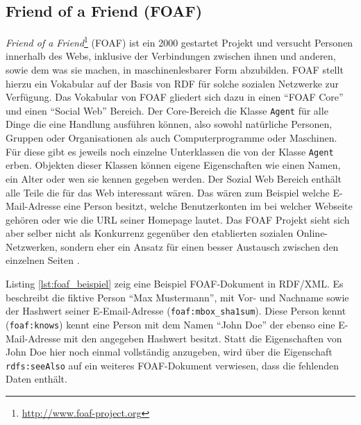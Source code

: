 

\subsection{Friend of a Friend (FOAF)} %
\label{sub:friend_of_a_friend_}

\emph{Friend of a Friend}\footnote{\url{http://www.foaf-project.org}} (FOAF) ist ein 2000 gestartet Projekt und versucht Personen innerhalb des Webs, inklusive der Verbindungen zwischen ihnen und anderen, sowie dem was sie machen, in maschinenlesbarer Form abzubilden. FOAF stellt hierzu ein Vokabular \cite{Brickley2010} auf der Basis von RDF für solche sozialen Netzwerke zur Verfügung. Das Vokabular von FOAF gliedert sich dazu in einen \enquote{FOAF Core} und einen \enquote{Social Web} Bereich. Der Core-Bereich die Klasse \texttt{Agent} für alle Dinge die eine Handlung ausführen können, also sowohl natürliche Personen, Gruppen oder Organisationen als auch Computerprogramme oder Maschinen. Für diese gibt es jeweils noch einzelne Unterklassen die von der Klasse \texttt{Agent} erben. Objekten dieser Klassen können eigene Eigenschaften wie einen Namen, ein Alter oder wen sie kennen gegeben werden. Der Sozial Web Bereich enthält alle Teile die für das Web interessant wären. Das wären zum Beispiel welche E-Mail-Adresse eine Person besitzt, welche Benutzerkonten im bei welcher Webseite gehören oder wie die URL seiner Homepage lautet. Das FOAF Projekt sieht sich aber selber nicht als Konkurrenz gegenüber den etablierten sozialen Online-Netzwerken, sondern eher ein Ansatz für einen besser Austausch zwischen den einzelnen Seiten \cite[Abstract]{Brickley2010}.

\medskip

Listing \ref{lst:foaf_beispiel} zeig eine Beispiel FOAF-Dokument in RDF/XML. Es beschreibt die fiktive Person \enquote{Max Mustermann}, mit Vor- und Nachname sowie der Hashwert seiner E-Email-Adresse (\texttt{foaf:mbox\_sha1sum}). Diese Person kennt (\texttt{foaf:knows}) kennt eine Person mit dem Namen \enquote{John Doe} der ebenso eine E-Mail-Adresse mit den angegeben Hashwert besitzt. Statt die Eigenschaften von John Doe hier noch einmal vollständig anzugeben, wird über die Eigenschaft \texttt{rdfs:seeAlso} auf ein weiteres FOAF-Dokument verwiesen, dass die fehlenden Daten enthält. 

